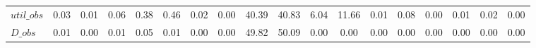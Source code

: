 \begin{center}
\begin{longtable}{lccccccccccccccccc}
$util\_obs      $	 & 	            0.03	 & 	            0.01	 & 	            0.06	 & 	            0.38	 & 	            0.46	 & 	            0.02	 & 	            0.00	 & 	           40.39	 & 	           40.83	 & 	            6.04	 & 	           11.66	 & 	            0.01	 & 	            0.08	 & 	            0.00	 & 	            0.01	 & 	            0.02	 & 	            0.00 \\ 
$D\_obs         $	 & 	            0.01	 & 	            0.00	 & 	            0.01	 & 	            0.05	 & 	            0.01	 & 	            0.00	 & 	            0.00	 & 	           49.82	 & 	           50.09	 & 	            0.00	 & 	            0.00	 & 	            0.00	 & 	            0.00	 & 	            0.00	 & 	            0.00	 & 	            0.00	 & 	            0.00 \\ 
\end{longtable}
 \end{center}
